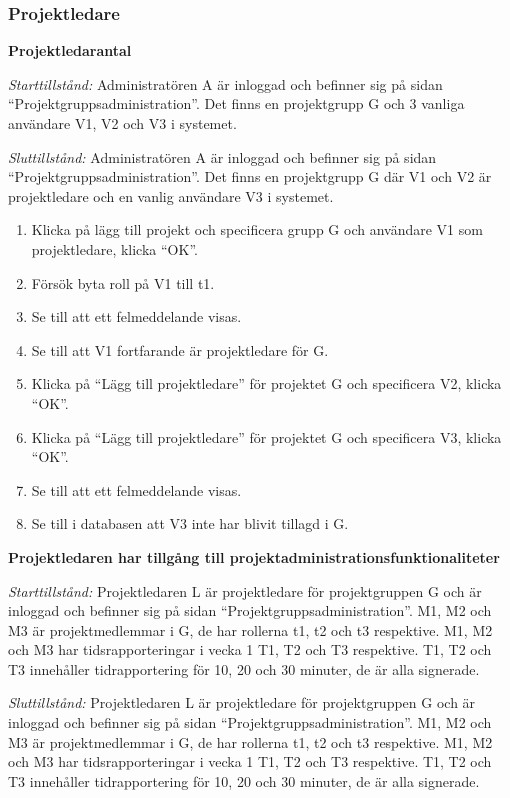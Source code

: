 \documentclass[a4paper]{article}
\begin{document}
\subsubsection{Projektledare}
\begin{FT}
\item \textbf{Projektledarantal}

\emph{Starttillstånd:} Administratören A är inloggad och befinner sig på sidan ``Projektgruppsadministration''. Det finns en projektgrupp G och 3 vanliga användare V1, V2 och V3 i systemet.

\emph{Sluttillstånd:} Administratören A är inloggad och befinner sig på sidan ``Projektgruppsadministration''. Det finns en projektgrupp G där V1 och V2 är projektledare och en vanlig användare V3 i systemet.

\begin{enumerate}
\item Klicka på lägg till projekt och specificera grupp G och användare V1 som projektledare, klicka ``OK''.
\item Försök byta roll på V1 till t1.
\item Se till att ett felmeddelande visas.
\item Se till att V1 fortfarande är projektledare för G.
\item Klicka på ``Lägg till projektledare'' för projektet G och specificera V2, klicka ``OK''.
\item Klicka på ``Lägg till projektledare'' för projektet G och specificera V3, klicka ``OK''.
\item Se till att ett felmeddelande visas.
\item Se till i databasen att V3 inte har blivit tillagd i G.
\end{enumerate}

\item \textbf{Projektledaren har tillgång till projektadministrationsfunktionaliteter}

\emph{Starttillstånd:} Projektledaren L är projektledare för projektgruppen G och är inloggad och befinner sig på sidan ``Projektgruppsadministration''. M1, M2 och M3 är projektmedlemmar i G, de har rollerna t1, t2 och t3 respektive. M1, M2 och M3 har tidsrapporteringar i vecka 1 T1, T2 och T3 respektive. T1, T2 och T3 innehåller tidrapportering för 10, 20 och 30 minuter, de är alla signerade.

\emph{Sluttillstånd:} Projektledaren L är projektledare för projektgruppen G och är inloggad och befinner sig på sidan ``Projektgruppsadministration''. M1, M2 och M3 är projektmedlemmar i G, de har rollerna t1, t2 och t3 respektive. M1, M2 och M3 har tidsrapporteringar i vecka 1 T1, T2 och T3 respektive. T1, T2 och T3 innehåller tidrapportering för 10, 20 och 30 minuter, de är alla signerade.


\end{FT}
\end{document}

